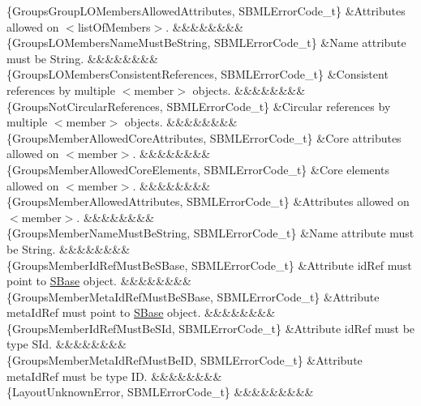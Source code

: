 \begin{DoxyParagraph}{}
\begin{longtabu}
\{Groups\+Group\+L\+O\+Members\+Allowed\+Attributes, S\+B\+M\+L\+Error\+Code\+\_\+t\} &Attributes allowed on {\ttfamily $<$list\+Of\+Members$>$}. &&&&&&&&\\
\{Groups\+L\+O\+Members\+Name\+Must\+Be\+String, S\+B\+M\+L\+Error\+Code\+\_\+t\} &Name attribute must be String. &&&&&&&&\\
\{Groups\+L\+O\+Members\+Consistent\+References, S\+B\+M\+L\+Error\+Code\+\_\+t\} &Consistent references by multiple {\ttfamily $<$member$>$} objects. &&&&&&&&\\
\{Groups\+Not\+Circular\+References, S\+B\+M\+L\+Error\+Code\+\_\+t\} &Circular references by multiple {\ttfamily $<$member$>$} objects. &&&&&&&&\\
\{Groups\+Member\+Allowed\+Core\+Attributes, S\+B\+M\+L\+Error\+Code\+\_\+t\} &Core attributes allowed on {\ttfamily $<$member$>$}. &&&&&&&&\\
\{Groups\+Member\+Allowed\+Core\+Elements, S\+B\+M\+L\+Error\+Code\+\_\+t\} &Core elements allowed on {\ttfamily $<$member$>$}. &&&&&&&&\\
\{Groups\+Member\+Allowed\+Attributes, S\+B\+M\+L\+Error\+Code\+\_\+t\} &Attributes allowed on {\ttfamily $<$member$>$}. &&&&&&&&\\
\{Groups\+Member\+Name\+Must\+Be\+String, S\+B\+M\+L\+Error\+Code\+\_\+t\} &Name attribute must be String. &&&&&&&&\\
\{Groups\+Member\+Id\+Ref\+Must\+Be\+S\+Base, S\+B\+M\+L\+Error\+Code\+\_\+t\} &Attribute \textquotesingle{}id\+Ref\textquotesingle{} must point to \hyperlink{class_s_base}{S\+Base} object. &&&&&&&&\\
\{Groups\+Member\+Meta\+Id\+Ref\+Must\+Be\+S\+Base, S\+B\+M\+L\+Error\+Code\+\_\+t\} &Attribute \textquotesingle{}meta\+Id\+Ref\textquotesingle{} must point to \hyperlink{class_s_base}{S\+Base} object. &&&&&&&&\\
\{Groups\+Member\+Id\+Ref\+Must\+Be\+S\+Id, S\+B\+M\+L\+Error\+Code\+\_\+t\} &Attribute \textquotesingle{}id\+Ref\textquotesingle{} must be type \textquotesingle{}S\+Id\textquotesingle{}. &&&&&&&&\\
\{Groups\+Member\+Meta\+Id\+Ref\+Must\+Be\+ID, S\+B\+M\+L\+Error\+Code\+\_\+t\} &Attribute \textquotesingle{}meta\+Id\+Ref\textquotesingle{} must be type \textquotesingle{}ID\textquotesingle{}. &&&&&&&&\\
\{Layout\+Unknown\+Error, S\+B\+M\+L\+Error\+Code\+\_\+t\} &&&&&&&&&\\

\end{longtabu}
\end{DoxyParagraph}
